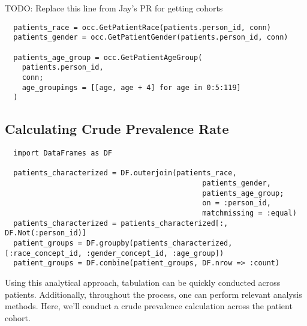 \documentclass{juliacon}
\begin{document}
TODO: Replace this line from Jay's PR for getting cohorts

\begin{verbatim}
  patients_race = occ.GetPatientRace(patients.person_id, conn)
  patients_gender = occ.GetPatientGender(patients.person_id, conn)

  patients_age_group = occ.GetPatientAgeGroup(
    patients.person_id, 
    conn; 
    age_groupings = [[age, age + 4] for age in 0:5:119]
  )
\end{verbatim}

\subsection{Calculating Crude Prevalence Rate}

\begin{verbatim}
  import DataFrames as DF

  patients_characterized = DF.outerjoin(patients_race,
                                              patients_gender,
                                              patients_age_group;
                                              on = :person_id, 
                                              matchmissing = :equal)
  patients_characterized = patients_characterized[:, DF.Not(:person_id)]
  patient_groups = DF.groupby(patients_characterized, [:race_concept_id, :gender_concept_id, :age_group])
  patient_groups = DF.combine(patient_groups, DF.nrow => :count)
\end{verbatim}

Using this analytical approach, tabulation can be quickly conducted across patients.
Additionally, throughout the process, one can perform relevant analysis methods.
Here, we'll conduct a crude prevalence calculation across the patient cohort.
\end{document}

